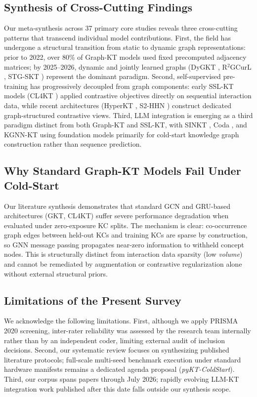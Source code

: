 \documentclass[10pt,journal,compsoc]{IEEEtran}
\begin{document}
\subsection{Synthesis of Cross-Cutting Findings}
Our meta-synthesis across 37 primary core studies reveals three cross-cutting patterns that transcend individual model contributions. First, the field has undergone a structural transition from static to dynamic graph representations: prior to 2022, over 80\% of Graph-KT models used fixed precomputed adjacency matrices; by 2025--2026, dynamic and jointly learned graphs (DyGKT \cite{KT038_DyGKT_2024}, R$^2$GCurL \cite{KT077_R2GCurL_2026}, STG-SKT \cite{KT079_STGSKT_2026}) represent the dominant paradigm. Second, self-supervised pre-training has progressively decoupled from graph components: early SSL-KT models (CL4KT \cite{KT039_CL4KT_2022}) applied contrastive objectives directly on sequential interaction data, while recent architectures (HyperKT \cite{KT066_HyperKT_2025}, S2-HHN \cite{KT042_S2HHN_2023}) construct dedicated graph-structured contrastive views. Third, LLM integration is emerging as a third paradigm distinct from both Graph-KT and SSL-KT, with SINKT \cite{KT044_SINKT_2024}, Coda \cite{KT070_Coda_2025}, and KGNN-KT \cite{KT076_KGNNKT_2025} using foundation models primarily for cold-start knowledge graph construction rather than sequence prediction.

\subsection{Why Standard Graph-KT Models Fail Under Cold-Start}
Our literature synthesis demonstrates that standard GCN and GRU-based architectures (GKT, CL4KT) suffer severe performance degradation when evaluated under zero-exposure KC splits. The mechanism is clear: co-occurrence graph edges between held-out KCs and training KCs are sparse by construction, so GNN message passing propagates near-zero information to withheld concept nodes. This is structurally distinct from interaction data sparsity (low \emph{volume}) and cannot be remediated by augmentation or contrastive regularization alone without external structural priors.

\subsection{Limitations of the Present Survey}
We acknowledge the following limitations. First, although we apply PRISMA 2020 screening, inter-rater reliability was assessed by the research team internally rather than by an independent coder, limiting external audit of inclusion decisions. Second, our systematic review focuses on synthesizing published literature protocols; full-scale multi-seed benchmark execution under standard hardware manifests remains a dedicated agenda proposal (\emph{pyKT-ColdStart}). Third, our corpus spans papers through July 2026; rapidly evolving LLM-KT integration work published after this date falls outside our synthesis scope.
\end{document}
